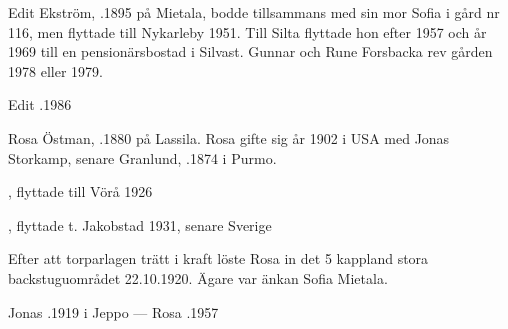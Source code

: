 %
Edit Ekström, .1895 på Mietala, bodde tillsammans med sin mor Sofia i gård nr 116, men flyttade till Nykarleby 1951. Till Silta flyttade hon efter 1957 och år 1969 till en pensionärsbostad i Silvast. Gunnar och Rune Forsbacka rev gården 1978 eller 1979.

Edit .1986



%
Rosa Östman, .1880 på Lassila. Rosa gifte sig år 1902 i USA med Jonas Storkamp, senare Granlund,  .1874 i Purmo.
\begin{jhchildren}
  \item {}, flyttade till Vörå 1926
  \item {}
  \item {}
  \item {}
  \item {}, flyttade t. Jakobstad 1931, senare Sverige
\end{jhchildren}

Efter att torparlagen trätt i kraft löste Rosa in det 5 kappland stora backstuguområdet 22.10.1920. Ägare var änkan Sofia Mietala.

Jonas .1919 i Jeppo  --- 	Rosa .1957




